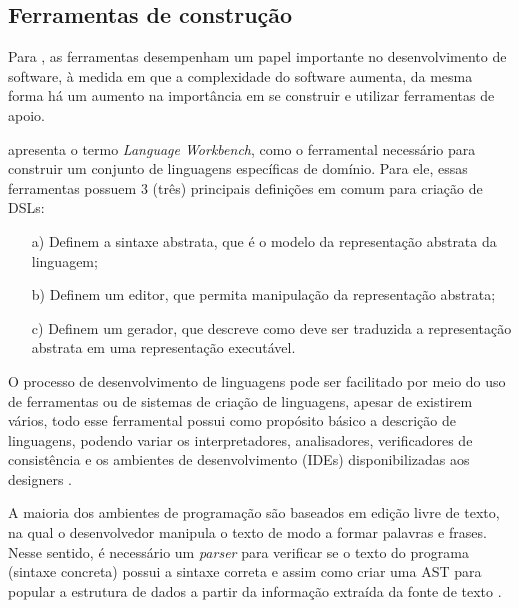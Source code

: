 \newpage
\subsection{Ferramentas de construção}
\label{ferramentasdsl}

Para , as ferramentas desempenham um papel importante no desenvolvimento de software, à medida em que a complexidade do software aumenta, da mesma forma há um aumento na importância em se construir e utilizar ferramentas de apoio.

 apresenta o termo \textit{Language Workbench}, como o ferramental necessário para construir um conjunto de linguagens específicas de domínio. Para ele, essas ferramentas possuem 3 (três) principais definições em comum para criação de \gls{DSL}s:

\begin{enumerate}
    \item[a)] Definem a sintaxe abstrata, que é o modelo da representação abstrata da linguagem;
    \item[b)] Definem um editor, que permita manipulação da representação abstrata;
    \item[c)] Definem um gerador, que descreve como deve ser traduzida a representação abstrata em uma representação executável.
\end{enumerate}

O processo de desenvolvimento de linguagens pode ser facilitado por meio do uso de ferramentas ou de sistemas de criação de linguagens, apesar de existirem vários, todo esse ferramental possui como propósito básico a descrição de linguagens, podendo variar os interpretadores, analisadores, verificadores de consistência e os ambientes de desenvolvimento (\gls{IDE}s) disponibilizadas aos designers \cite{mernik2005and}. 

\begin{citacao}


A maioria dos ambientes de programação são baseados em edição livre de texto, na qual o desenvolvedor manipula o texto de modo a formar palavras e frases. Nesse sentido, é necessário um \textit{parser} para verificar se o texto do programa (sintaxe concreta) possui a sintaxe correta e assim como criar uma \gls{AST} para popular a estrutura de dados a partir da informação extraída da fonte de texto  \cite[p.179]{dslengineering}.

\end{citacao}


